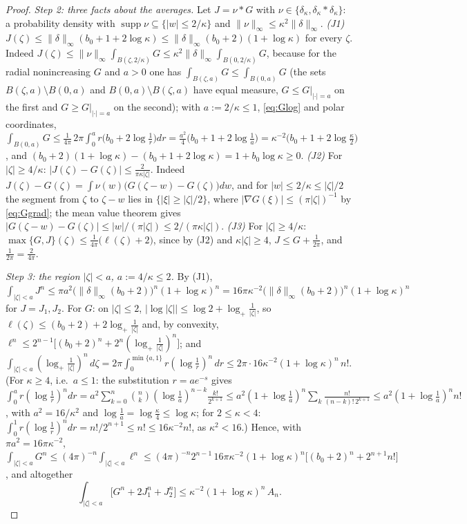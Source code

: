 \documentclass[11pt,a4paper]{article}
\theoremstyle{plain}
\theoremstyle{definition}
\theoremstyle{plain}
\theoremstyle{definition}
\DeclareMathOperator{\supp}{supp}
\begin{document}
\begin{proof}
\emph{Step 2: three facts about the averages.}  Let $J=\nu*G$ with $\nu\in\{\delta_\kappa,
\delta_\kappa*\delta_\kappa\}$: a probability density with $\supp\nu\subseteq\{|w|\le2/\kappa\}$
and $\|\nu\|_\infty\le\kappa^2\|\delta\|_\infty$.
\emph{(J1)} $J(\zeta)\le\|\delta\|_\infty(b_0+1+2\log\kappa)\le\|\delta\|_\infty(b_0+2)(1+\log
\kappa)$ for every $\zeta$.  Indeed $J(\zeta)\le\|\nu\|_\infty\int_{B(\zeta,2/\kappa)}G\le
\kappa^2\|\delta\|_\infty\int_{B(0,2/\kappa)}G$, because for the radial nonincreasing $G$ and
$a>0$ one has $\int_{B(\zeta,a)}G\le\int_{B(0,a)}G$ (the sets $B(\zeta,a)\setminus B(0,a)$ and
$B(0,a)\setminus B(\zeta,a)$ have equal measure, $G\le G|_{|\cdot|=a}$ on the first and
$G\ge G|_{|\cdot|=a}$ on the second); with $a:=2/\kappa\le1$, \eqref{eq:Glog} and polar
coordinates, $\int_{B(0,a)}G\le\frac1{4\pi}\,2\pi\int_0^ar\bigl(b_0+2\log\tfrac1r\bigr)dr
=\frac{a^2}4\bigl(b_0+1+2\log\tfrac1a\bigr)=\kappa^{-2}\bigl(b_0+1+2\log\tfrac\kappa2\bigr)$,
and $(b_0+2)(1+\log\kappa)-(b_0+1+2\log\kappa)=1+b_0\log\kappa\ge0$.
\emph{(J2)} For $|\zeta|\ge4/\kappa$: $|J(\zeta)-G(\zeta)|\le\frac2{\pi\kappa|\zeta|}$.  Indeed
$J(\zeta)-G(\zeta)=\int\nu(w)\bigl(G(\zeta-w)-G(\zeta)\bigr)dw$, and for $|w|\le2/\kappa\le
|\zeta|/2$ the segment from $\zeta$ to $\zeta-w$ lies in $\{|\xi|\ge|\zeta|/2\}$, where
$|\nabla G(\xi)|\le(\pi|\zeta|)^{-1}$ by \eqref{eq:Ggrad}; the mean value theorem gives
$|G(\zeta-w)-G(\zeta)|\le|w|/(\pi|\zeta|)\le2/(\pi\kappa|\zeta|)$.
\emph{(J3)} For $|\zeta|\ge4/\kappa$: $\max\{G,J\}(\zeta)\le\frac1{4\pi}\bigl(\ell(\zeta)+2
\bigr)$, since by (J2) and $\kappa|\zeta|\ge4$, $J\le G+\frac1{2\pi}$, and $\frac1{2\pi}=
\frac2{4\pi}$.

\emph{Step 3: the region $|\zeta|<a$, $a:=4/\kappa\le2$.}  By (J1), $\int_{|\zeta|<a}J^n\le
\pi a^2\bigl(\|\delta\|_\infty(b_0+2)\bigr)^n(1+\log\kappa)^n=16\pi\kappa^{-2}\bigl(\|\delta\|_
\infty(b_0+2)\bigr)^n(1+\log\kappa)^n$ for $J=J_1,J_2$.  For $G$: on $|\zeta|\le2$,
$|\log|\zeta||\le\log2+\log_+\frac1{|\zeta|}$, so $\ell(\zeta)\le(b_0+2)+2\log_+\frac1{|\zeta|}$
and, by convexity, $\ell^n\le2^{n-1}\bigl[(b_0+2)^n+2^n(\log_+\frac1{|\zeta|})^n\bigr]$; and
$\int_{|\zeta|<a}(\log_+\frac1{|\zeta|})^n\,d\zeta=2\pi\int_0^{\min\{a,1\}}r(\log\tfrac1r)^n\,dr
\le2\pi\cdot16\kappa^{-2}(1+\log\kappa)^n\,n!$.  (For $\kappa\ge4$, i.e.\ $a\le1$: the
substitution $r=ae^{-s}$ gives $\int_0^ar(\log\frac1r)^ndr=a^2\sum_{k=0}^n\binom nk(\log\tfrac1a
)^{n-k}\frac{k!}{2^{k+1}}\le a^2(1+\log\tfrac1a)^n\sum_k\frac{n!}{(n-k)!\,2^{k+1}}\le a^2(1+\log
\tfrac1a)^nn!$, with $a^2=16/\kappa^2$ and $\log\frac1a=\log\frac\kappa4\le\log\kappa$; for
$2\le\kappa<4$: $\int_0^1r(\log\frac1r)^ndr=n!/2^{n+1}\le n!\le16\kappa^{-2}n!$, as $\kappa^2<16$.)
Hence, with $\pi a^2=16\pi\kappa^{-2}$,
$\int_{|\zeta|<a}G^n\le(4\pi)^{-n}\int_{|\zeta|<a}\ell^n\le(4\pi)^{-n}2^{n-1}\,16\pi\kappa^{-2}
(1+\log\kappa)^n\bigl[(b_0+2)^n+2^{n+1}n!\bigr]$, and altogether
\[
  \int_{|\zeta|<a}\bigl[G^n+2J_1^n+J_2^n\bigr]\le\kappa^{-2}(1+\log\kappa)^n\,A_n .
\]


\end{proof}
\end{document}
